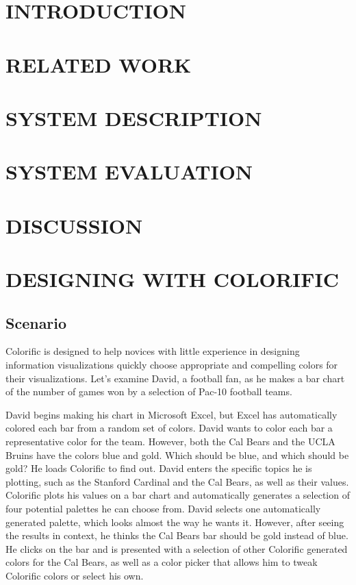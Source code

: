 \documentclass{article}
\begin{document}



\section{INTRODUCTION}


\section{RELATED WORK}

\section{SYSTEM DESCRIPTION}

\section{SYSTEM EVALUATION}

\section{DISCUSSION}

\section{DESIGNING WITH COLORIFIC}
\subsection{Scenario}
Colorific is designed to help novices with little experience in designing information visualizations quickly choose appropriate and compelling colors for their visualizations. Let's examine David, a football fan, as he makes a bar chart of the number of games won by a selection of Pac-10 football teams. 

David begins making his chart in Microsoft Excel, but Excel has automatically colored each bar from a random set of colors. David wants to color each bar a representative color for the team. However, both the Cal Bears and the UCLA Bruins have the colors blue and gold. Which should be blue, and which should be gold? He loads Colorific to find out. David enters the specific topics he is plotting, such as the Stanford Cardinal and the Cal Bears, as well as their values. Colorific plots his values on a bar chart and automatically generates a selection of four potential palettes he can choose from. David selects one automatically generated palette, which looks almost the way he wants it. However, after seeing the results in context, he thinks the Cal Bears bar should be gold instead of blue. He clicks on the bar and is presented with a selection of other Colorific generated colors for the Cal Bears, as well as a color picker that allows him to tweak Colorific colors or select his own. 
\end{document}
